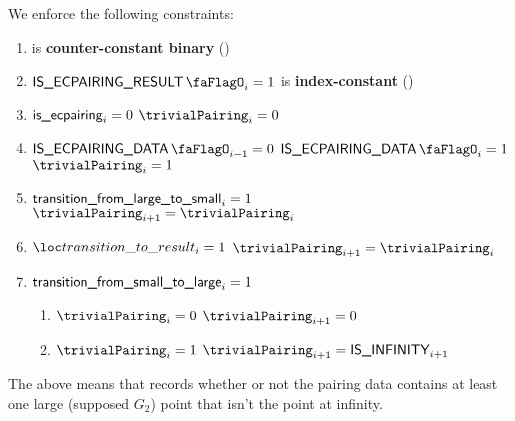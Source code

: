 We enforce the following constraints:
\begin{enumerate}
    \item \trivialPairing{} is \textbf{counter-constant binary} \quad (\trash)
    \item \If $\isEcpairingResult_{i} = 1$ \Then \trivialPairing{} is \textbf{index-constant} \quad (\trash)
    \item \If $\textsf{is\_ecpairing} _{i} = 0$ \Then $\trivialPairing _{i} = 0$
    \item \If $\isEcpairingData_{i - 1} = 0$ \et $\isEcpairingData _{i} = 1$ \Then $\trivialPairing_{i} = 1$
    \item \If $\textsf{transition\_from\_large\_to\_small}_{i} = 1$ \Then $\trivialPairing_{i+1} = \trivialPairing_{i}$
    \item \If $\locTransitionToResult_{i} = 1$ \Then $\trivialPairing_{i+1} = \trivialPairing_{i}$
    \item  \If $\textsf{transition\_from\_small\_to\_large}_{i} = 1$ \Then
          \begin{enumerate}
              \item \If $\trivialPairing _{i} = 0$ \Then $\trivialPairing _{i + 1} = 0$
              \item \If $\trivialPairing _{i} = 1$ \Then $\trivialPairing _{i + 1} = \isInfinity_{i + 1}$
          \end{enumerate}
\end{enumerate}
\saNote{} The above means that \trivialPairing{} records whether or not the pairing data contains at least one large (supposed $G_2$) point that isn't the point at infinity.

